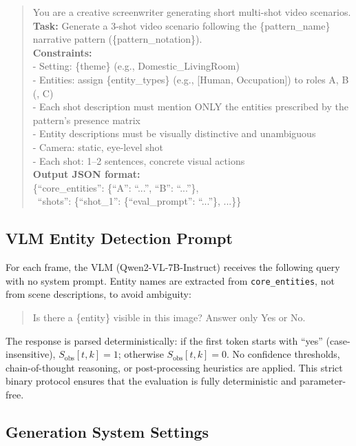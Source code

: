 \documentclass[sigconf,review,anonymous]{acmart}
\begin{document}
\begin{quote}
\small
\ttfamily
You are a creative screenwriter generating short multi-shot video scenarios.\\[4pt]
\textbf{Task:} Generate a 3-shot video scenario following the \{pattern\_name\} narrative pattern (\{pattern\_notation\}).\\[4pt]
\textbf{Constraints:}\\
- Setting: \{theme\} (e.g., Domestic\_LivingRoom)\\
- Entities: assign \{entity\_types\} (e.g., [Human, Occupation]) to roles A, B (, C)\\
- Each shot description must mention ONLY the entities prescribed by the pattern's presence matrix\\
- Entity descriptions must be visually distinctive and unambiguous\\
- Camera: static, eye-level shot\\
- Each shot: 1--2 sentences, concrete visual actions\\[4pt]
\textbf{Output JSON format:}\\
\{``core\_entities'': \{``A'': ``...'', ``B'': ``...''\},\\
\ ``shots'': \{``shot\_1'': \{``eval\_prompt'': ``...''\}, ...\}\}
\end{quote}

\subsection{VLM Entity Detection Prompt}

For each frame, the VLM (Qwen2-VL-7B-Instruct) receives the following query with no system prompt. Entity names are extracted from \texttt{core\_entities}, not from scene descriptions, to avoid ambiguity:

\begin{quote}
\small
\ttfamily
Is there a \{entity\} visible in this image? Answer only Yes or No.
\end{quote}

\noindent The response is parsed deterministically: if the first token starts with ``yes'' (case-insensitive), $S_\text{obs}[t,k] = 1$; otherwise $S_\text{obs}[t,k] = 0$. No confidence thresholds, chain-of-thought reasoning, or post-processing heuristics are applied. This strict binary protocol ensures that the evaluation is fully deterministic and parameter-free.

\subsection{Generation System Settings}
\end{document}
